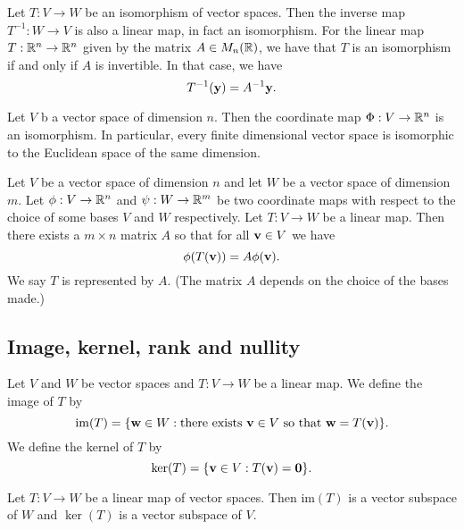\documentclass[10pt, a4paper]{article}
\begin{document}
\begin{lemma}
    Let $T : V \rightarrow W$ be an isomorphism of vector spaces.
    Then the inverse map $T ^ {-1} : W \rightarrow V$ is also a linear map,
    in fact an isomorphism.
    For the linear map $T : \mathbb{R} ^ n \rightarrow \mathbb{R} ^ n$ given by the matrix $A \in M_n(\mathbb{R})$,
    we have that $T$ is an isomorphism if and only if $A$ is invertible.
    In that case,
    we have
    \[
    T ^ {-1}(\mathbf{y}) = A ^ {-1}\mathbf{y}.
    \]
\end{lemma}

\begin{lemma}
    Let $V$ b a vector space of dimension $n$.
    Then the coordinate map $\Phi : V \rightarrow \mathbb{R} ^ n$ is an isomorphism.
    In particular,
    every finite dimensional vector space is isomorphic to the Euclidean space of the same dimension.
\end{lemma}

\begin{theorem}
    Let $V$ be a vector space of dimension $n$ and let $W$ be a vector space of dimension $m$.
    Let $\phi : V \rightarrow \mathbb{R} ^ n$ and $\psi : W \rightarrow \mathbb{R} ^ m$ be two coordinate maps with respect to the choice of some bases $V$ and $W$ respectively.
    Let $T : V \rightarrow W$ be a linear map.
    Then there exists a $m \times n$ matrix $A$ so that for all $\mathbf{v} \in V$ we have
    \[
    \phi(T(\mathbf{v})) = A\phi(\mathbf{v}).
    \]
    We say $T$ is represented by $A$.
    (The matrix $A$ depends on the choice of the bases made.)
\end{theorem}

\subsection{Image, kernel, rank and nullity}
\begin{definition}
    Let $V$ and $W$ be vector spaces and $T : V \rightarrow W$ be a linear map.
    We define the image of $T$ by
    \[
    \mathrm{im}(T) = \{\mathbf{w} \in W : \text{there exists $\mathbf{v} \in V$ so that } \mathbf{w} = T(\mathbf{v})\}.
    \]
    We define the kernel of $T$ by
    \[
    \ker(T) = \{\mathbf{v} \in V : T(\mathbf{v}) = \mathbf{0}\}.
    \]
\end{definition}

\begin{lemma}
    Let $T : V \rightarrow W$ be a linear map of vector spaces.
    Then $\mathrm{im}(T)$ is a vector subspace of $W$ and $\ker(T)$ is a vector subspace of $V$.
\end{lemma}
\end{document}
